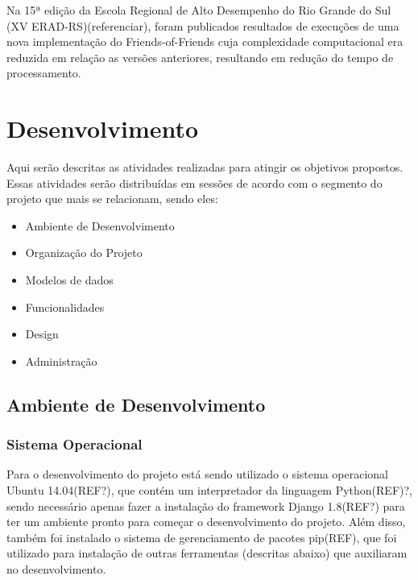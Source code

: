 \documentclass[tg]{mdtufsm}
\begin{document}
Na 15ª edição da Escola Regional de Alto Desempenho do Rio Grande do Sul (XV ERAD-RS)(referenciar), foram publicados resultados de execuções de uma nova implementação do Friends-of-Friends\cite{friends} cuja complexidade computacional era reduzida em relação as versões anteriores, resultando em redução do tempo de processamento.



\chapter{Desenvolvimento}

Aqui serão descritas as atividades realizadas para atingir os objetivos propostos. Essas atividades serão distribuídas em sessões de acordo com o segmento do projeto que mais se relacionam, sendo eles:

\begin{itemize}
	\item Ambiente de Desenvolvimento
	\item Organização do Projeto
	\item Modelos de dados
	\item Funcionalidades
	\item Design
	\item Administração
\end{itemize}

\section{Ambiente de Desenvolvimento}

\subsection{Sistema Operacional}

Para o desenvolvimento do projeto está sendo utilizado o sistema operacional Ubuntu 14.04(REF?), que contém um interpretador da linguagem Python(REF)?, sendo necessário apenas fazer a instalação do framework Django 1.8(REF?) para ter um ambiente pronto para começar o desenvolvimento do projeto. Além disso, também foi instalado o sistema de gerenciamento de pacotes pip(REF), que foi utilizado para instalação de outras ferramentas (descritas abaixo) que auxiliaram no desenvolvimento.
\end{document}
